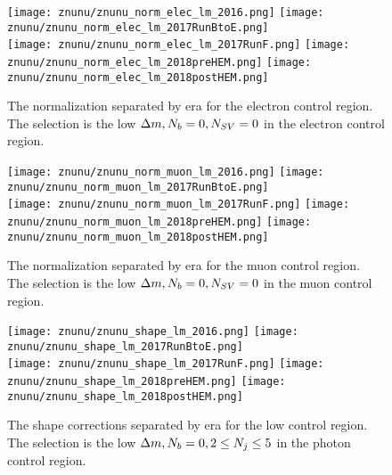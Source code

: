 \begin{figure}[!h]
	\begin{center}
  \texttt{[image: znunu/znunu\_norm\_elec\_lm\_2016.png]}
  \texttt{[image: znunu/znunu\_norm\_elec\_lm\_2017RunBtoE.png]} \\
  \texttt{[image: znunu/znunu\_norm\_elec\_lm\_2017RunF.png]}
  \texttt{[image: znunu/znunu\_norm\_elec\_lm\_2018preHEM.png]}
  \texttt{[image: znunu/znunu\_norm\_elec\_lm\_2018postHEM.png]}
	\end{center}
	\caption[\Znunu{} Normalization for electrons by Era]{The \Znunu{} normalization separated by era for the electron control region. The selection is the low $\Delta m, N_{b}=0, N_{SV}=0$ in the electron control region.
	 }
	\label{fig:znunu-norm-lm-elec}
\end{figure}

\begin{figure}[!h]
	\begin{center}
  \texttt{[image: znunu/znunu\_norm\_muon\_lm\_2016.png]}
  \texttt{[image: znunu/znunu\_norm\_muon\_lm\_2017RunBtoE.png]} \\
  \texttt{[image: znunu/znunu\_norm\_muon\_lm\_2017RunF.png]}
  \texttt{[image: znunu/znunu\_norm\_muon\_lm\_2018preHEM.png]}
  \texttt{[image: znunu/znunu\_norm\_muon\_lm\_2018postHEM.png]}
	\end{center}
	\caption[\Znunu{} Normalization for muons by Era]{The \Znunu{} normalization separated by era for the muon control region. The selection is the low $\Delta m, N_{b}=0, N_{SV}=0$ in the muon control region.
	 }
	\label{fig:znunu-norm-lm-muon}
\end{figure}

\begin{figure}[!h]
	\begin{center}
  \texttt{[image: znunu/znunu\_shape\_lm\_2016.png]}
  \texttt{[image: znunu/znunu\_shape\_lm\_2017RunBtoE.png]} \\
  \texttt{[image: znunu/znunu\_shape\_lm\_2017RunF.png]}
  \texttt{[image: znunu/znunu\_shape\_lm\_2018preHEM.png]}
  \texttt{[image: znunu/znunu\_shape\_lm\_2018postHEM.png]}
	\end{center}
	\caption[\Znunu{} Shape by Era]{The \Znunu{} shape corrections separated by era for the low \dm{} control region. The selection is the low $\Delta m, N_{b}=0, 2\leq N_{j}\leq5$ in the photon control region.
	 }
	\label{fig:znunu-shape-lm-photon}
\end{figure}